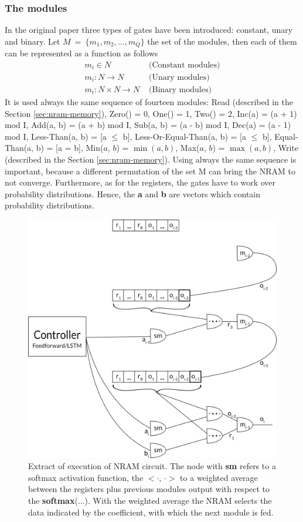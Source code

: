 \subsubsection*{The modules}
In the original paper three types of gates have been introduced: constant, unary and binary. Let $M\ =\ \{m_1, m_2, \dots, m_Q \}$ the set of the modules, then each of them can be represented as a function as follows
\begin{align}
		m_i \in N & \textrm{ (Constant modules)} \\
		m_i: N \rightarrow N & \textrm{ (Unary modules)} \\
		m_i: N \times N \rightarrow N & \textrm{ (Binary modules)}
\end{align}
It is used always the same sequence of fourteen modules: Read (described in the Section \ref{sec:nram-memory}), Zero() = 0, One() = 1, Two() = 2, Inc(a) = (a + 1) mod I, Add(a, b) = (a + b) mod I, Sub(a, b) = (a - b) mod I, Dec(a) = (a - 1) mod I, Less-Than(a, b) = [a $\le$ b], Less-Or-Equal-Than(a, b) = [a $\leq$ b], Equal-Than(a, b) = [a = b], Min($a$, $b$) = $\min(a, b)$, Max($a$, $b$) = $\max(a, b)$, Write (described in the Section \ref{sec:nram-memory}). Using always the same sequence is important, because a different permutation of the set M can bring the NRAM to not converge. Furthermore, as for the registers, the gates have to work over probability distributions. Hence, the \textbf{a} and \textbf{b} are vectors which contain probability distributions.

\begin{figure}[t!]
	\centering
	\includegraphics[width=\textwidth]{figures/register-only-model.png}
	\caption{Extract of execution of NRAM circuit. The node with \textbf{sm} refers to a softmax activation function, the $<\cdot$, $\cdot>$ to a weighted average between the registers plus previous modules output with respect to the \textbf{softmax}($\dots$). With the weighted average the NRAM selects the data indicated by the coefficient, with which the next module is fed.}
	\label{fig:register-only-model}
\end{figure}

